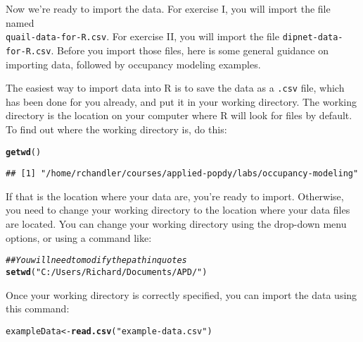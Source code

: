 \documentclass[12pt]{article}\usepackage[]{graphicx}\usepackage[]{color}
\makeatletter
\newcommand{\hlstr}[1]{\textcolor[rgb]{0.192,0.494,0.8}{#1}}%
\newcommand{\hlcom}[1]{\textcolor[rgb]{0.678,0.584,0.686}{\textit{#1}}}%
\newcommand{\hlstd}[1]{\textcolor[rgb]{0.345,0.345,0.345}{#1}}%
\newcommand{\hlkwb}[1]{\textcolor[rgb]{0.69,0.353,0.396}{#1}}%
\newcommand{\hlkwd}[1]{\textcolor[rgb]{0.737,0.353,0.396}{\textbf{#1}}}%
\newenvironment{kframe}{%
 \def\at@end@of@kframe{}%
 \ifinner\ifhmode%
  \def\at@end@of@kframe{\end{minipage}}%
  \begin{minipage}{\columnwidth}%
 \fi\fi%
 \def\FrameCommand##1{\hskip\@totalleftmargin \hskip-\fboxsep
 \colorbox{shadecolor}{##1}\hskip-\fboxsep
     \hskip-\linewidth \hskip-\@totalleftmargin \hskip\columnwidth}%
 \MakeFramed {\advance\hsize-\width
   \@totalleftmargin\z@ \linewidth\hsize
   \@setminipage}}%
 {\par\unskip\endMakeFramed%
 \at@end@of@kframe}
\newenvironment{knitrout}{}{} %
\makeatother
\begin{document}
Now we're ready to import the data. For exercise I, you will import
the file named \\ \texttt{quail-data-for-R.csv}. For exercise II, you
will import the file \texttt{dipnet-data-for-R.csv}. Before you import
those files, here is some general guidance on importing data, followed
by occupancy modeling examples.


The easiest way to import data into R is to save the data as a
\texttt{.csv} file, which has been done for you already, and put it in
your working directory. The working directory is the location on your
computer where R will look for files by default. To find out
where the working directory is, do this:  
    
\begin{knitrout}
\color{fgcolor}\begin{kframe}
\begin{alltt}
\hlkwd{getwd}\hlstd{()}
\end{alltt}
\begin{verbatim}
## [1] "/home/rchandler/courses/applied-popdy/labs/occupancy-modeling"
\end{verbatim}
\end{kframe}
\end{knitrout}

If that is the location where your data are, you're ready to
import. Otherwise, you need to change your working directory to the
location where your data files are located. You can change your
working directory using the drop-down menu options, or using a command
like:   

\begin{knitrout}
\color{fgcolor}\begin{kframe}
\begin{alltt}
\hlcom{## You will need to modify the path in quotes}
\hlkwd{setwd}\hlstd{(}\hlstr{"C:/Users/Richard/Documents/APD/"}\hlstd{)}
\end{alltt}
\end{kframe}
\end{knitrout}

Once your working directory is correctly specified, you can import the
data using this command: 

\begin{knitrout}
\color{fgcolor}\begin{kframe}
\begin{alltt}
\hlstd{exampleData} \hlkwb{<-} \hlkwd{read.csv}\hlstd{(}\hlstr{"example-data.csv"}\hlstd{)}
\end{alltt}
\end{kframe}
\end{knitrout}
\end{document}
